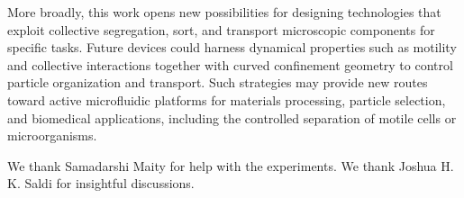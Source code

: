 \documentclass[aps,pre,twocolumn,amsmath,amssymb,notitlepage,superscriptaddress,longbibliography,nofootinbib,10pt]{revtex4-1}
\begin{document}
More broadly, this work opens new possibilities for designing technologies that exploit collective segregation, sort, and transport microscopic components for specific tasks. Future devices could harness dynamical properties such as motility and collective interactions together with curved confinement geometry to control particle organization and transport. Such strategies may provide new routes toward active microfluidic platforms for materials processing, particle selection, and biomedical applications, including the controlled separation of motile cells or microorganisms.

\begin{acknowledgments}
We thank Samadarshi Maity for help with the experiments. We thank Joshua H. K. Saldi for insightful discussions.
 
\end{acknowledgments}


\end{document}

